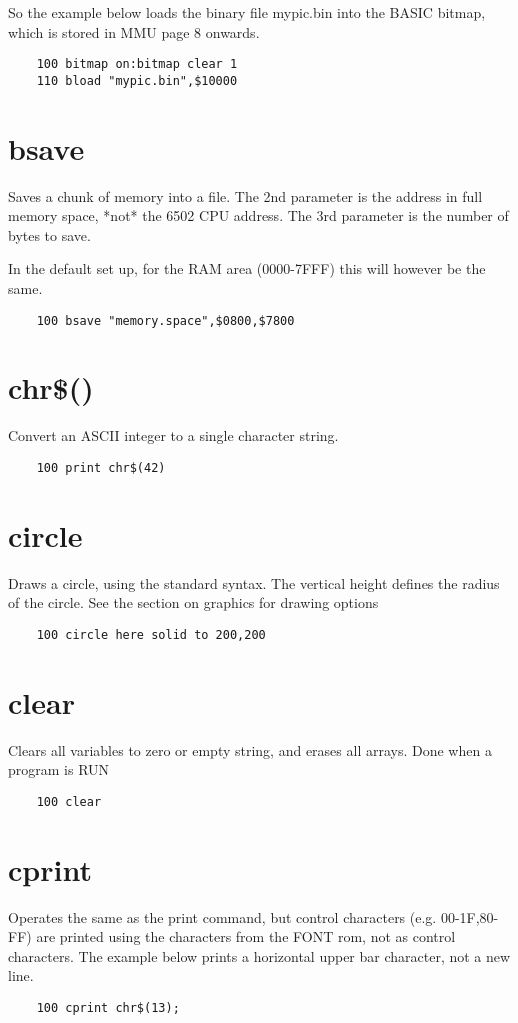 So the example below loads the binary file mypic.bin into the BASIC bitmap, which is stored in MMU page 8 onwards.
\example{}
\begin{verbatim}
	100 bitmap on:bitmap clear 1
	110 bload "mypic.bin",$10000
\end{verbatim}

\section*{bsave}
Saves a chunk of memory into a file. The 2nd parameter is the address in full memory space, *not* the 6502 CPU address. The 3rd parameter is the number of bytes to save.

In the default set up, for the RAM area (0000-7FFF) this will however be the same.

\example{}
\begin{verbatim}
	100 bsave "memory.space",$0800,$7800
\end{verbatim}

\section*{chr\$()}
Convert an ASCII integer to a single character string.
\example{}
\begin{verbatim}
	100 print chr$(42)
\end{verbatim}

\section*{circle}
Draws a circle, using the standard syntax. The vertical height defines the radius of the circle. See the section on graphics for drawing options
\example{}
\begin{verbatim}
	100 circle here solid to 200,200
\end{verbatim}

\section*{clear}
Clears all variables to zero or empty string, and erases all arrays. Done when a program is RUN
\example{}
\begin{verbatim}
	100 clear
\end{verbatim}

\section*{cprint}
Operates the same as the print command, but control characters (e.g. 00-1F,80-FF) are printed using the characters from the FONT rom, not as control characters. The example below prints a horizontal upper bar character, not a new line.
\example{}
\begin{verbatim}
	100 cprint chr$(13);
\end{verbatim}

